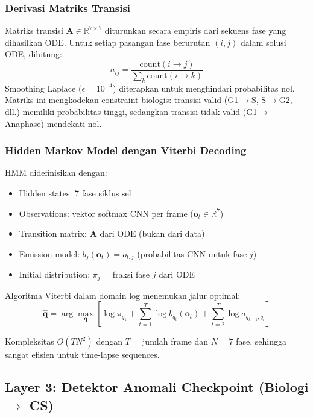 \documentclass[conference]{IEEEtran}
\begin{document}
\subsubsection{Derivasi Matriks Transisi}
Matriks transisi $\mathbf{A} \in \mathbb{R}^{7\times7}$ diturunkan secara empiris dari sekuens fase yang dihasilkan ODE. Untuk setiap pasangan fase berurutan $(i, j)$ dalam solusi ODE, dihitung:
\begin{equation}
    a_{ij} = \frac{\text{count}(i \rightarrow j)}{\sum_k \text{count}(i \rightarrow k)}
\end{equation}
Smoothing Laplace ($\epsilon = 10^{-4}$) diterapkan untuk menghindari probabilitas nol. Matriks ini mengkodekan constraint biologis: transisi valid (G1$\rightarrow$S, S$\rightarrow$G2, dll.) memiliki probabilitas tinggi, sedangkan transisi tidak valid (G1$\rightarrow$Anaphase) mendekati nol.

\subsubsection{Hidden Markov Model dengan Viterbi Decoding}
HMM didefinisikan dengan:
\begin{itemize}[noitemsep,topsep=3pt]
    \item Hidden states: 7 fase siklus sel
    \item Observations: vektor softmax CNN per frame ($\mathbf{o}_t \in \mathbb{R}^7$)
    \item Transition matrix: $\mathbf{A}$ dari ODE (bukan dari data)
    \item Emission model: $b_j(\mathbf{o}_t) = o_{t,j}$ (probabilitas CNN untuk fase $j$)
    \item Initial distribution: $\pi_j$ = fraksi fase $j$ dari ODE
\end{itemize}

Algoritma Viterbi dalam domain log menemukan jalur optimal:
\begin{equation}
    \hat{\mathbf{q}} = \arg\max_{\mathbf{q}} \left[\log\pi_{q_1} + \sum_{t=1}^{T} \log b_{q_t}(\mathbf{o}_t) + \sum_{t=2}^{T} \log a_{q_{t-1},q_t}\right]
\end{equation}

Kompleksitas $O(TN^2)$ dengan $T$ = jumlah frame dan $N = 7$ fase, sehingga sangat efisien untuk time-lapse sequences.


\subsection{Layer 3: Detektor Anomali Checkpoint (Biologi $\rightarrow$ CS)}
\end{document}
